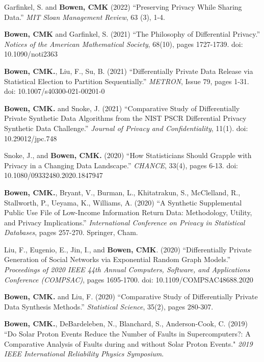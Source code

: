 \begin{etaremune}[topsep=0pt, itemsep=5pt, partopsep=0pt, parsep=0pt]
    \item Garfinkel, S. and \textbf{Bowen, CMK} (2022) ``Preserving Privacy While Sharing Data.'' \textit{MIT Sloan Management Review}, 63 (3), 1-4.
    
    \item \textbf{Bowen, CMK} and Garfinkel, S. (2021) ``The Philosophy of Differential Privacy.'' \textit{Notices of the American Mathematical Society}, 68(10), pages 1727-1739. doi: 10.1090/noti2363
    
    \item \textbf{Bowen, CMK.}, Liu, F., Su, B. (2021) ``Differentially Private Data Release via Statistical Election to Partition Sequentially.'' \textit{METRON}, Issue 79, pages 1-31. doi: 10.1007/s40300-021-00201-0
    
    \item \textbf{Bowen, CMK.} and Snoke, J. (2021) ``Comparative Study of Differentially Private Synthetic Data Algorithms from the NIST PSCR Differential Privacy Synthetic Data Challenge.'' \textit{Journal of Privacy and Confidentiality}, 11(1). doi: 10.29012/jpc.748
    
    \item Snoke, J., and \textbf{Bowen, CMK.} (2020) ``How Statisticians Should Grapple with Privacy in a Changing Data Landscape.'' \textit{CHANCE}, 33(4), pages 6-13. doi: 10.1080/09332480.2020.1847947
    
    \item \textbf{Bowen, CMK.}, Bryant, V., Burman, L., Khitatrakun, S., McClelland, R., Stallworth, P., Ueyama, K., Williams, A. (2020) ``A Synthetic Supplemental Public Use File of Low-Income Information Return Data: Methodology, Utility, and Privacy Implications.'' \textit{International Conference on Privacy in Statistical Databases}, pages 257-270. Springer, Cham.
    
    \item Liu, F., Eugenio, E., Jin, I., and \textbf{Bowen, CMK}. (2020) ``Differentially Private Generation of Social Networks via Exponential Random Graph Models.'' \textit{Proceedings of 2020 IEEE 44th Annual Computers, Software, and Applications Conference (COMPSAC)}, pages 1695-1700. doi: 10.1109/COMPSAC48688.2020

    \item \textbf{Bowen, CMK.} and Liu, F. (2020) ``Comparative Study of Differentially Private Data Synthesis Methods.'' \textit{Statistical Science}, 35(2), pages 280-307.

    \item \textbf{Bowen, CMK.}, DeBardeleben, N., Blanchard, S., Anderson-Cook, C. (2019) ``Do Solar Proton Events Reduce the Number of Faults in Supercomputers?: A Comparative Analysis of Faults during and without Solar Proton Events." \textit{2019 IEEE International Reliability Physics Symposium}.


\end{etaremune}
